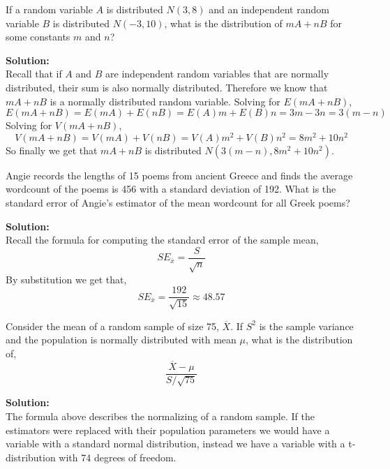 \documentclass[12pt]{article}
\makeatletter
\theoremstyle{homework}
\newenvironment{exercise}[1]
{\def\@currentlabel{#1}\exercisecore}
{\endexercisecore}
\newcommand{\localhead}[1]{\par\smallskip\noindent\textbf{#1}\nobreak\\}%
\newcommand\solution{\localhead{Solution:}}
\makeatother
\begin{document}
\begin{exercise}{7} If a random variable $A$ is distributed $N(3,8)$ and an independent random variable 
    $B$ is distributed $N(-3,10)$, what is the distribution of $mA+nB$ for some constants $m$ and $n$?\\
    \solution Recall that if $A$ and $B$ are independent random variables that are normally distributed, their 
    sum is also normally distributed. Therefore we know that $mA+nB$ is a normally distributed random variable.
    Solving for $E(mA+nB)$,
    \begin{equation*}
        E(mA+nB) = E(mA)+E(nB) = E(A)m+E(B)n = 3m-3n = 3(m-n)
    \end{equation*}
    Solving for $V(mA+nB)$, 
    \begin{equation*}
        V(mA+nB) = V(mA)+ V(nB) = V(A)m^2 + V(B)n^2 = 8m^2 + 10n^2
    \end{equation*}
    So finally we get that $mA+nB$ is distributed $N(3(m-n),8m^2 + 10n^2)$.
\end{exercise}
\newpage



\begin{exercise}{8} Angie records the lengths of 15 poems from ancient Greece and finds the average wordcount
    of the poems is 456 with a standard deviation of 192. What is the standard error of Angie's estimator of 
    the mean wordcount for all Greek poems?\\
    \solution Recall the formula for computing the standard error of the sample mean, 
    \begin{equation*}
        SE_{\overline{x}} = \frac{S}{\sqrt{n}}
    \end{equation*}
    By substitution we get that, 
    \begin{equation*}
        SE_{\overline{x}} = \frac{192}{\sqrt{15}} \approx 48.57 
    \end{equation*}
\end{exercise}
\newpage



\begin{exercise}{9} Consider the mean of a random sample of size 75, $\overline{X}$. If $S^2$ is the 
    sample variance and the population is normally distributed with mean $\mu$, what is the distribution of,
    \begin{equation*}
        \dfrac{\overline{X} - \mu}{S/\sqrt{75}}
    \end{equation*}
    \solution The formula above describes the normalizing of a random sample. If the estimators 
    were replaced with their population parameters we would have a variable with a standard normal distribution, instead
    we have a variable with a t-distribution with 74 degrees of freedom. 
\end{exercise}
\newpage
\end{document}
